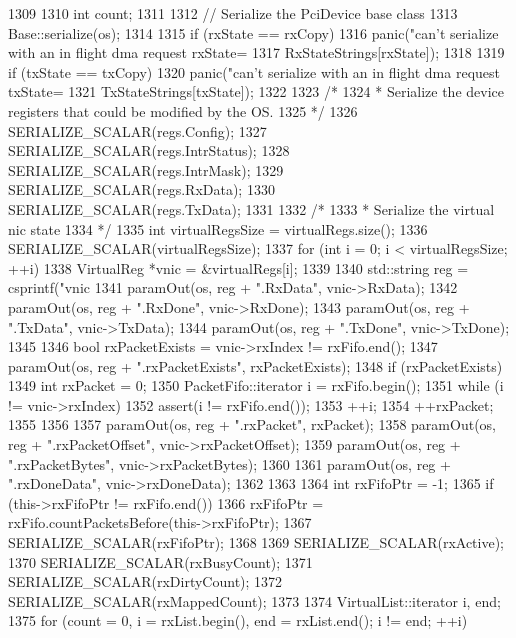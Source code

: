 \begin{DoxyCode}
1309 {
1310     int count;
1311 
1312     // Serialize the PciDevice base class
1313     Base::serialize(os);
1314 
1315     if (rxState == rxCopy)
1316         panic("can't serialize with an in flight dma request rxState=%
1317               RxStateStrings[rxState]);
1318 
1319     if (txState == txCopy)
1320         panic("can't serialize with an in flight dma request txState=%
1321               TxStateStrings[txState]);
1322 
1323     /*
1324      * Serialize the device registers that could be modified by the OS.
1325      */
1326     SERIALIZE_SCALAR(regs.Config);
1327     SERIALIZE_SCALAR(regs.IntrStatus);
1328     SERIALIZE_SCALAR(regs.IntrMask);
1329     SERIALIZE_SCALAR(regs.RxData);
1330     SERIALIZE_SCALAR(regs.TxData);
1331 
1332     /*
1333      * Serialize the virtual nic state
1334      */
1335     int virtualRegsSize = virtualRegs.size();
1336     SERIALIZE_SCALAR(virtualRegsSize);
1337     for (int i = 0; i < virtualRegsSize; ++i) {
1338         VirtualReg *vnic = &virtualRegs[i];
1339 
1340         std::string reg = csprintf("vnic%
1341         paramOut(os, reg + ".RxData", vnic->RxData);
1342         paramOut(os, reg + ".RxDone", vnic->RxDone);
1343         paramOut(os, reg + ".TxData", vnic->TxData);
1344         paramOut(os, reg + ".TxDone", vnic->TxDone);
1345 
1346         bool rxPacketExists = vnic->rxIndex != rxFifo.end();
1347         paramOut(os, reg + ".rxPacketExists", rxPacketExists);
1348         if (rxPacketExists) {
1349             int rxPacket = 0;
1350             PacketFifo::iterator i = rxFifo.begin();
1351             while (i != vnic->rxIndex) {
1352                 assert(i != rxFifo.end());
1353                 ++i;
1354                 ++rxPacket;
1355             }
1356 
1357             paramOut(os, reg + ".rxPacket", rxPacket);
1358             paramOut(os, reg + ".rxPacketOffset", vnic->rxPacketOffset);
1359             paramOut(os, reg + ".rxPacketBytes", vnic->rxPacketBytes);
1360         }
1361         paramOut(os, reg + ".rxDoneData", vnic->rxDoneData);
1362     }
1363 
1364     int rxFifoPtr = -1;
1365     if (this->rxFifoPtr != rxFifo.end())
1366         rxFifoPtr = rxFifo.countPacketsBefore(this->rxFifoPtr);
1367     SERIALIZE_SCALAR(rxFifoPtr);
1368 
1369     SERIALIZE_SCALAR(rxActive);
1370     SERIALIZE_SCALAR(rxBusyCount);
1371     SERIALIZE_SCALAR(rxDirtyCount);
1372     SERIALIZE_SCALAR(rxMappedCount);
1373 
1374     VirtualList::iterator i, end;
1375     for (count = 0, i = rxList.begin(), end = rxList.end(); i != end; ++i)
}
\end{DoxyCode}

